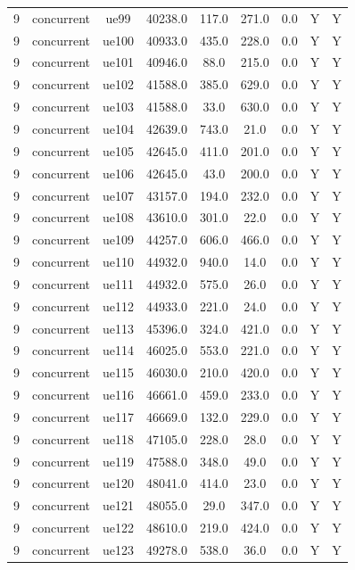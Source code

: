 \begin{table}[ht]
\begin{tabular}{|c|c|c|c|c|c|c|c|c|}
9 & concurrent & ue99 & 40238.0 & 117.0 & 271.0 & 0.0 & Y & Y \\
9 & concurrent & ue100 & 40933.0 & 435.0 & 228.0 & 0.0 & Y & Y \\
9 & concurrent & ue101 & 40946.0 & 88.0 & 215.0 & 0.0 & Y & Y \\
9 & concurrent & ue102 & 41588.0 & 385.0 & 629.0 & 0.0 & Y & Y \\
9 & concurrent & ue103 & 41588.0 & 33.0 & 630.0 & 0.0 & Y & Y \\
9 & concurrent & ue104 & 42639.0 & 743.0 & 21.0 & 0.0 & Y & Y \\
9 & concurrent & ue105 & 42645.0 & 411.0 & 201.0 & 0.0 & Y & Y \\
9 & concurrent & ue106 & 42645.0 & 43.0 & 200.0 & 0.0 & Y & Y \\
9 & concurrent & ue107 & 43157.0 & 194.0 & 232.0 & 0.0 & Y & Y \\
9 & concurrent & ue108 & 43610.0 & 301.0 & 22.0 & 0.0 & Y & Y \\
9 & concurrent & ue109 & 44257.0 & 606.0 & 466.0 & 0.0 & Y & Y \\
9 & concurrent & ue110 & 44932.0 & 940.0 & 14.0 & 0.0 & Y & Y \\
9 & concurrent & ue111 & 44932.0 & 575.0 & 26.0 & 0.0 & Y & Y \\
9 & concurrent & ue112 & 44933.0 & 221.0 & 24.0 & 0.0 & Y & Y \\
9 & concurrent & ue113 & 45396.0 & 324.0 & 421.0 & 0.0 & Y & Y \\
9 & concurrent & ue114 & 46025.0 & 553.0 & 221.0 & 0.0 & Y & Y \\
9 & concurrent & ue115 & 46030.0 & 210.0 & 420.0 & 0.0 & Y & Y \\
9 & concurrent & ue116 & 46661.0 & 459.0 & 233.0 & 0.0 & Y & Y \\
9 & concurrent & ue117 & 46669.0 & 132.0 & 229.0 & 0.0 & Y & Y \\
9 & concurrent & ue118 & 47105.0 & 228.0 & 28.0 & 0.0 & Y & Y \\
9 & concurrent & ue119 & 47588.0 & 348.0 & 49.0 & 0.0 & Y & Y \\
9 & concurrent & ue120 & 48041.0 & 414.0 & 23.0 & 0.0 & Y & Y \\
9 & concurrent & ue121 & 48055.0 & 29.0 & 347.0 & 0.0 & Y & Y \\
9 & concurrent & ue122 & 48610.0 & 219.0 & 424.0 & 0.0 & Y & Y \\
9 & concurrent & ue123 & 49278.0 & 538.0 & 36.0 & 0.0 & Y & Y \\

\end{tabular}
\end{table}
